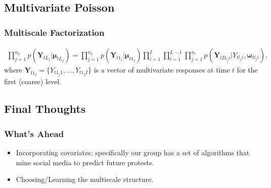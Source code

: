 \documentclass{beamer}
\begin{document}
\subsection{Multivariate Poisson}
\begin{frame}
	\frametitle{Multiscale Factorization}
	\small
	\begin{eqnarray*}
	\prod_{j=1}^{n_L} p(\boldsymbol{Y}_{tL_j}|\boldsymbol{\mu}_{tL_j})= \prod_{j=1}^{n_1} p(\boldsymbol{Y}_{t1_j}
	|\boldsymbol{\mu}_{t1_j}) \prod_{i=1}^I\prod_{l=1}^{L-1} \prod_{j=1}^{n_l} 
	p(\boldsymbol{Y}_{t{D_{l_j}i}}|Y_{tl_ji},\boldsymbol{\omega}_{tl_ji}),
	\end{eqnarray*}
	where $\boldsymbol{Y}_{t1_j} = \{Y_{t1_j1}, ..., Y_{t1_jI}\}$ is a vector of multivariate responses at 
	time $t$ for the first (coarse) level. 
\end{frame}


\subsection{Final Thoughts}
\begin{frame}
	\frametitle{What's Ahead}
	\begin{itemize}
	\item Incorporating covariates: specifically our group has a set of algorithms that mine social media to predict
	 future protests.
	\item Choosing/Learning the multiscale structure.
	\end{itemize}
\end{frame}
\end{document}
